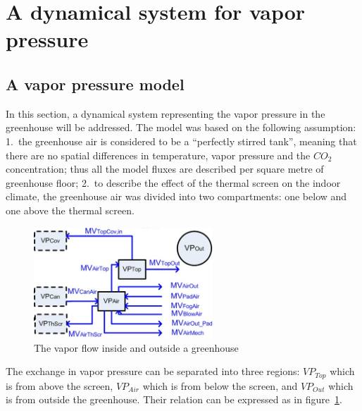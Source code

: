 \documentclass[a4paper]{article}
\begin{document}


\newpage
\section{A dynamical system for vapor pressure}
\subsection{A vapor pressure model}
In this section, a dynamical system representing the vapor pressure in the greenhouse will be addressed.
The model was based on the following assumption:
1.\ the greenhouse air is considered to be a ``perfectly stirred tank'', meaning that there are no spatial differences in temperature, vapor pressure and the \(CO_2\) concentration; thus all the model fluxes are described per square metre of greenhouse floor;
2.\ to describe the effect of the thermal screen on the indoor climate, the greenhouse air was divided into two compartments: one below and one above the thermal screen.

\begin{figure}[H]
  \centering
  \includegraphics[width=0.6\textwidth]{VP}
  \caption{The vapor flow inside and outside a greenhouse}\label{fig:VP}
\end{figure}

The exchange in vapor pressure can be separated into three regions: \(VP_{Top}\) which is from above the screen, \(VP_{Air}\) which is from below the screen, and \(VP_{Out}\) which is from outside the greenhouse.
Their relation can be expressed as in figure~\ref{fig:VP}.
\end{document}
